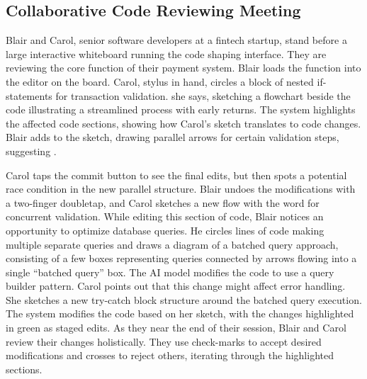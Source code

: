 \subsection{Collaborative Code Reviewing Meeting}
Blair and Carol, senior software developers at a fintech startup, stand before a large interactive whiteboard running the code shaping interface. They are reviewing the core  function of their payment system.
Blair loads the function into the editor on the board. Carol, stylus in hand, circles a block of nested if-statements for transaction validation.  she says, sketching a flowchart beside the code illustrating a streamlined process with early returns.
The system highlights the affected code sections, showing how Carol's sketch translates to code changes. Blair adds to the sketch, drawing parallel arrows for certain validation steps, suggesting .

Carol taps the commit button to see the final edits, but then spots a potential race condition in the new parallel structure. Blair undoes the modifications with a two-finger doubletap, and Carol sketches a new flow with the word  for concurrent validation.
While editing this section of code, Blair notices an opportunity to optimize database queries. He circles lines of code making multiple separate queries and draws a diagram of a batched query approach, consisting of a few boxes representing queries connected by arrows flowing into a single ``batched query'' box.
The AI model modifies the code to use a query builder pattern.
Carol points out that this change might affect error handling. She sketches a new try-catch block structure around the batched query execution. The system modifies the code based on her sketch, with the changes highlighted in green as staged edits.
As they near the end of their session, Blair and Carol review their changes holistically. They use check-marks to accept desired modifications and crosses to reject others, iterating through the highlighted sections.

